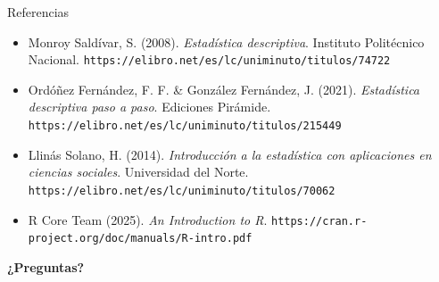 \documentclass[aspectratio=169,10pt]{beamer}
\begin{document}
\begin{frame}{Referencias}
  \footnotesize
  \begin{itemize}
    \item[{[1]}] Monroy Saldívar, S. (2008). \textit{Estadística descriptiva}.
      Instituto Politécnico Nacional.
      \texttt{https://elibro.net/es/lc/uniminuto/titulos/74722}
    \item[{[2]}] Ordóñez Fernández, F. F. \& González Fernández, J. (2021).
      \textit{Estadística descriptiva paso a paso}. Ediciones Pirámide.
      \texttt{https://elibro.net/es/lc/uniminuto/titulos/215449}
    \item[{[3]}] Llinás Solano, H. (2014). \textit{Introducción a la
      estadística con aplicaciones en ciencias sociales}. Universidad del
      Norte. \texttt{https://elibro.net/es/lc/uniminuto/titulos/70062}
    \item[{[4]}] R Core Team (2025). \textit{An Introduction to R}.
      \texttt{https://cran.r-project.org/doc/manuals/R-intro.pdf}
  \end{itemize}

  \vspace{0.25cm}
  \begin{center}
    {\Large\color{uniAzul}\textbf{¿Preguntas?}}
  \end{center}
\end{frame}
\end{document}
